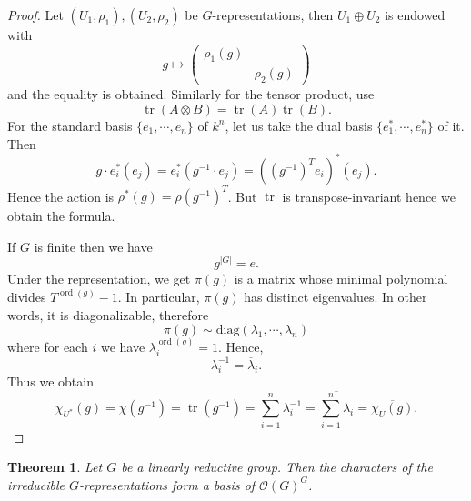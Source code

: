 \documentclass[10pt]{article}
\newtheorem{theorem}{Theorem} [section]
\numberwithin{equation}{theorem}
\DeclareMathOperator{\tr}{tr}
\DeclareMathOperator{\ord}{ord}
\newcommand{\Ouv}[0]{\mathcal{O}}
\begin{document}
\begin{proof}
  Let $(U_1,\rho_1),(U_2,\rho_2)$ be $G$-representations, then $U_1\oplus U_2$ is endowed with
  \begin{equation*}
    g\mapsto \begin{pmatrix}
      \rho_1(g) & \:\\ \: & \rho_2(g)
    \end{pmatrix}
  \end{equation*}
  and the equality is obtained. Similarly for the tensor product, use 
  \begin{equation*}
    \tr(A\otimes B) = \tr(A)\tr(B).
  \end{equation*}
  For the standard basis $\{e_1,\cdots,e_n\}$ of $k^n$, let us take the dual basis $\{e_1^*,\cdots,e_n^*\}$ of it. Then 
  \begin{equation*}
    g\cdot e_i^*(e_j) = e_i^*(g^{-1}\cdot e_j) = ((g^{-1})^Te_i)^*(e_j).
  \end{equation*}
  Hence the action is $\rho^*(g) = \rho(g^{-1})^T$. But $\tr$ is transpose-invariant hence we obtain the formula.
  \par If $G$ is finite then we have 
  \begin{equation*}
    g^{\vert G\vert} = e.
  \end{equation*}
  Under the representation, we get $\pi(g)$ is a matrix whose minimal polynomial divides $T^{\ord(g)}-1$. 
  In particular, $\pi(g)$ has distinct eigenvalues. In other words, it is diagonalizable, therefore
  \begin{equation*}
  \pi(g)\sim\mathrm{diag}(\lambda_1,\cdots,\lambda_n)
  \end{equation*}
  where for each $i$ we have $\lambda_i^{\ord(g)} = 1$. Hence, 
  \begin{equation*}
    \lambda_i^{-1} = \overline{\lambda}_i.
  \end{equation*}
  Thus we obtain 
  \begin{equation*}
  \chi_{U^*}(g) = \chi(g^{-1})=\tr(g^{-1}) = \sum_{i=1}^n \lambda_i^{-1} = \overline{\sum_{i=1}^n \lambda_i} = \overline{\chi_U(g)}.
  \end{equation*}
\end{proof}
\begin{theorem}
  Let $G$ be a linearly reductive group. Then the characters of the irreducible $G$-representations form a basis of $\Ouv(G)^G$. 
\end{theorem}
\end{document}
